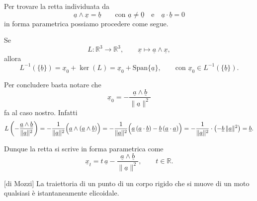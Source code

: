 \begin{oss}{}
Per trovare la retta individuata da
\[
\underline{a}\wedge \underline{x}=\underline{b}
\qquad \text{con } \underline{a}\neq \underline{0}
\quad \text{e} \quad
\underline{a}\cdot \underline{b}=0
\]
in forma parametrica possiamo procedere come segue.

Se
\[
L:\mathbb{R}^3\to\mathbb{R}^3,
\qquad
\underline{x}\mapsto \underline{a}\wedge \underline{x},
\]
allora
\[
L^{-1}(\{\underline{b}\})=\underline{x}_0+\ker(L)=\underline{x}_0+\mathrm{Span}\{\underline{a}\},
\qquad
\text{con } \underline{x}_0\in L^{-1}(\{\underline{b}\}).
\]

Per concludere basta notare che
\[
\underline{x}_0=-\frac{\underline{a}\wedge \underline{b}}{\|\underline{a}\|^2}
\]
fa al caso nostro. Infatti
\[
L\left(-\frac{\underline{a}\wedge \underline{b}}{\|\underline{a}\|^2}\right)
=
-\frac{1}{\|\underline{a}\|^2}\Bigl(\underline{a}\wedge(\underline{a}\wedge \underline{b})\Bigr)
=
-\frac{1}{\|\underline{a}\|^2}\Bigl(\underline{a}\,(\underline{a}\cdot \underline{b})-\underline{b}\,(\underline{a}\cdot \underline{a})\Bigr)
=
-\frac{1}{\|\underline{a}\|^2}\cdot\bigl(-\underline{b}\,\|\underline{a}\|^2\bigr)
=
\underline{b}.
\]

Dunque la retta si scrive in forma parametrica come
\[
\underline{x}_t=t\,\underline{a}-\frac{\underline{a}\wedge \underline{b}}{\|\underline{a}\|^2},
\qquad
t\in\mathbb{R}.
\]

\end{oss}
\fineapprof
\begin{theorem}{}[di Mozzi]
    La traiettoria di un punto di un corpo rigido che si muove di un moto qualsiasi è istantaneamente elicoidale.
\end{theorem}
